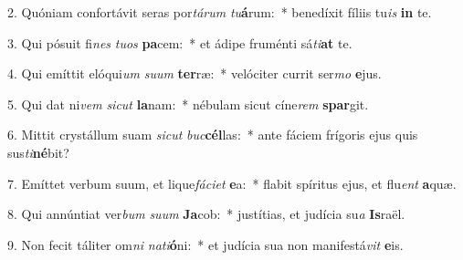 2. Quóniam confortávit seras por\textit{tá}\textit{rum} \textit{tu}\textbf{á}rum:~*  benedíxit fíliis tu\textit{is} \textbf{in} te.\

3. Qui pósuit fi\textit{nes} \textit{tu}\textit{os} \textbf{pa}cem:~*  et ádipe fruménti sá\textit{ti}\textbf{at} te.\

4. Qui emíttit elóqui\textit{um} \textit{su}\textit{um} \textbf{ter}ræ:~*  velóciter currit ser\textit{mo} \textbf{e}jus.\

5. Qui dat ni\textit{vem} \textit{sic}\textit{ut} \textbf{la}nam:~*  nébulam sicut cíne\textit{rem} \textbf{spar}git.\

6. Mittit crystállum suam \textit{sic}\textit{ut} \textit{buc}\textbf{cél}las:~*  ante fáciem frígoris ejus quis sus\textit{ti}\textbf{né}bit?\

7. Emíttet verbum suum, et lique\textit{fá}\textit{ci}\textit{et} \textbf{e}a:~*  flabit spíritus ejus, et flu\textit{ent} \textbf{a}quæ.\

8. Qui annúntiat ver\textit{bum} \textit{su}\textit{um} \textbf{Ja}cob:~*  justítias, et judícia su\textit{a} \textbf{Is}raël.\

9. Non fecit táliter om\textit{ni} \textit{na}\textit{ti}\textbf{ó}ni:~*  et judícia sua non manifestá\textit{vit} \textbf{e}is.\

